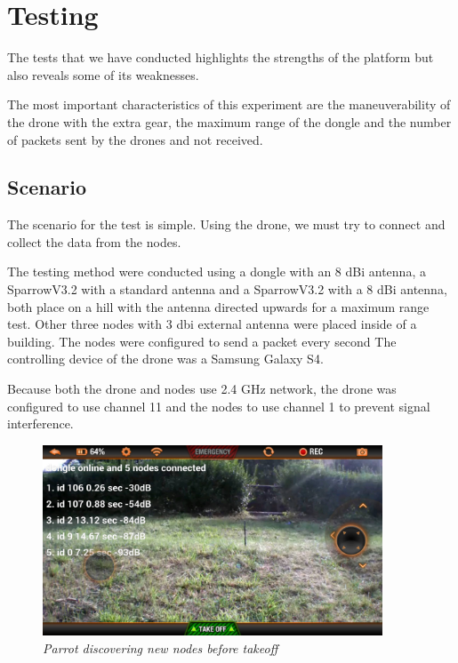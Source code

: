 \normalfont\normalsize
\chapter{Testing}

The tests that we have conducted highlights the strengths of the platform but also reveals some of its weaknesses.

The most important characteristics of this experiment are the maneuverability of the drone with the extra gear, the maximum range of the dongle and the number of packets sent by the drones and not received.
 

\section{Scenario}

The scenario for the test is simple. Using the drone, we must try to connect and collect the data from the nodes.

The testing method were conducted using a dongle with an 8 dBi antenna, a SparrowV3.2  with a standard antenna and a SparrowV3.2 with a 8 dBi antenna, both place on a hill with the antenna directed upwards for a maximum range test. Other  three nodes with 3 dbi external antenna were placed inside of a building. The nodes were configured to send a packet every second The controlling device of the drone was a Samsung Galaxy S4.

Because both the drone and nodes use 2.4 GHz network, the drone was configured to use channel 11 and the nodes to use channel 1 to prevent signal interference.

\begin{figure}[ht]
\begin{center}
\includegraphics[width=0.9\textwidth]{img/parrot_test.png}
\end{center}
\caption{\small \itshape{Parrot discovering new nodes before takeoff}}
\end{figure}


